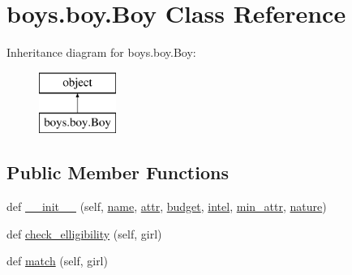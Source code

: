 \hypertarget{classboys_1_1boy_1_1_boy}{}\section{boys.\+boy.\+Boy Class Reference}
\label{classboys_1_1boy_1_1_boy}
Inheritance diagram for boys.\+boy.\+Boy\+:\begin{figure}[H]
\begin{center}
\leavevmode
\includegraphics[height=2.000000cm]{classboys_1_1boy_1_1_boy}
\end{center}
\end{figure}
\subsection*{Public Member Functions}
\begin{DoxyCompactItemize}
\item 
def \hyperlink{classboys_1_1boy_1_1_boy_a0b2cf3e089d1258b179bdb784d29e49a}{\+\_\+\+\_\+init\+\_\+\+\_\+} (self, \hyperlink{classboys_1_1boy_1_1_boy_a514c8925a76eb6af83bb59b5c6463b8d}{name}, \hyperlink{classboys_1_1boy_1_1_boy_a48d62174385cc6ca7b1fa64051e817b5}{attr}, \hyperlink{classboys_1_1boy_1_1_boy_ad2a3cceabf13f65bd93b878075d73c55}{budget}, \hyperlink{classboys_1_1boy_1_1_boy_a1d9b84b6e47b4f09589bc8b90bed47c8}{intel}, \hyperlink{classboys_1_1boy_1_1_boy_abc427640fd12a0fa2ec7f4ae99330f46}{min\+\_\+attr}, \hyperlink{classboys_1_1boy_1_1_boy_ab142b2f597ee95ecbb5d1d2c375958f6}{nature})
\item 
def \hyperlink{classboys_1_1boy_1_1_boy_a5f362ff3f418d5a4895d00ede2ab2658}{check\+\_\+elligibility} (self, girl)
\item 
def \hyperlink{classboys_1_1boy_1_1_boy_aecc00e0e2da51ce4b9d6d40d040aa5fa}{match} (self, girl)
\end{DoxyCompactItemize}
